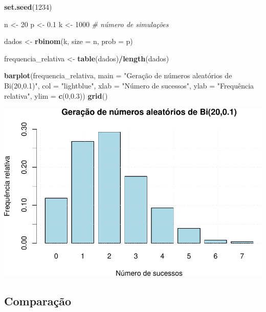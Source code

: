 \documentclass[
]{book}
\newenvironment{Shaded}{\begin{snugshade}}{\end{snugshade}}
\newcommand{\AttributeTok}[1]{\textcolor[rgb]{0.13,0.29,0.53}{#1}}
\newcommand{\CommentTok}[1]{\textcolor[rgb]{0.56,0.35,0.01}{\textit{#1}}}
\newcommand{\DecValTok}[1]{\textcolor[rgb]{0.00,0.00,0.81}{#1}}
\newcommand{\FloatTok}[1]{\textcolor[rgb]{0.00,0.00,0.81}{#1}}
\newcommand{\FunctionTok}[1]{\textcolor[rgb]{0.13,0.29,0.53}{\textbf{#1}}}
\newcommand{\NormalTok}[1]{#1}
\newcommand{\OtherTok}[1]{\textcolor[rgb]{0.56,0.35,0.01}{#1}}
\newcommand{\SpecialCharTok}[1]{\textcolor[rgb]{0.81,0.36,0.00}{\textbf{#1}}}
\newcommand{\StringTok}[1]{\textcolor[rgb]{0.31,0.60,0.02}{#1}}
\begin{document}
\begin{Shaded}
\begin{Highlighting}[]
\FunctionTok{set.seed}\NormalTok{(}\DecValTok{1234}\NormalTok{)}

\NormalTok{n }\OtherTok{\textless{}{-}} \DecValTok{20}
\NormalTok{p }\OtherTok{\textless{}{-}} \FloatTok{0.1}
\NormalTok{k }\OtherTok{\textless{}{-}} \DecValTok{1000} \CommentTok{\# número de simulações}

\NormalTok{dados }\OtherTok{\textless{}{-}} \FunctionTok{rbinom}\NormalTok{(k, }\AttributeTok{size =}\NormalTok{ n, }\AttributeTok{prob =}\NormalTok{ p)}

\NormalTok{frequencia\_relativa }\OtherTok{\textless{}{-}} \FunctionTok{table}\NormalTok{(dados)}\SpecialCharTok{/}\FunctionTok{length}\NormalTok{(dados)}

\FunctionTok{barplot}\NormalTok{(frequencia\_relativa,}
        \AttributeTok{main =} \StringTok{"Geração de números aleatórios de Bi(20,0.1)"}\NormalTok{,}
        \AttributeTok{col =} \StringTok{"lightblue"}\NormalTok{,}
        \AttributeTok{xlab =} \StringTok{"Número de sucessos"}\NormalTok{,}
        \AttributeTok{ylab =} \StringTok{"Frequência relativa"}\NormalTok{,}
        \AttributeTok{ylim =} \FunctionTok{c}\NormalTok{(}\DecValTok{0}\NormalTok{,}\FloatTok{0.3}\NormalTok{))}
\FunctionTok{grid}\NormalTok{()}
\end{Highlighting}
\end{Shaded}

\includegraphics{introR_files/figure-latex/unnamed-chunk-248-1.pdf}

\subsection{Comparação}\label{comparauxe7uxe3o}
\end{document}
